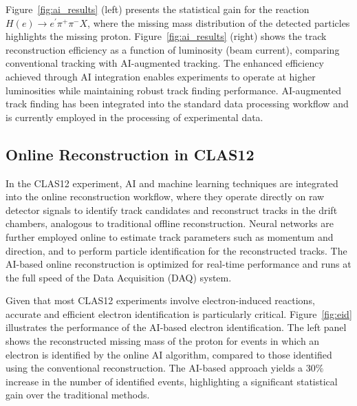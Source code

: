 Figure~\ref{fig:ai_results} (left) presents the statistical gain for the reaction $H(e) \rightarrow e^\prime\pi^+\pi^-X$, where the missing mass distribution of the detected particles highlights the missing proton. Figure~\ref{fig:ai_results} (right) shows the track reconstruction efficiency as a function of luminosity (beam current), comparing conventional tracking with AI-augmented tracking. The enhanced efficiency achieved through AI integration enables experiments to operate at higher luminosities while maintaining robust track finding performance. AI-augmented track finding has been integrated into the standard data processing workflow and is currently employed in the processing of experimental data.

\subsection{Online Reconstruction in CLAS12}

In the CLAS12 experiment, AI and machine learning techniques are integrated into the online reconstruction workflow, where they operate directly on raw detector signals to identify track candidates and reconstruct tracks in the drift chambers, analogous to traditional offline reconstruction. Neural networks are further employed online to estimate track parameters such as momentum and direction, and to perform particle identification for the reconstructed tracks. The AI-based online reconstruction is optimized for real-time performance and runs at the full speed of the Data Acquisition (DAQ) system.

Given that most CLAS12 experiments involve electron-induced reactions, accurate and efficient electron identification is particularly critical. Figure~\ref{fig:eid} illustrates the performance of the AI-based electron identification. The left panel shows the reconstructed missing mass of the proton for events in which an electron is identified by the online AI algorithm, compared to those identified using the conventional reconstruction. The AI-based approach yields a $30\%$ increase in the number of identified events, highlighting a significant statistical gain over the traditional methods.

